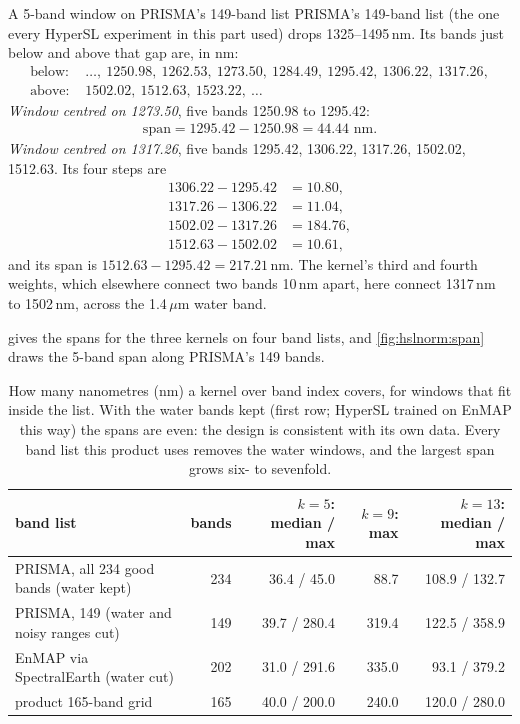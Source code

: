 \begin{worked}[label={we:hslnorm:span}]{A 5-band window on PRISMA's 149-band list}
PRISMA's 149-band list (the one every HyperSL experiment in this part used) drops 1325--1495\,nm. Its bands just below
and above that gap are, in nm\tagC:
\begin{align*}
\text{below: }&\dots,\ 1250.98,\ 1262.53,\ 1273.50,\ 1284.49,\ 1295.42,\ 1306.22,\ 1317.26,\\
\text{above: }&1502.02,\ 1512.63,\ 1523.22,\ \dots
\end{align*}
\emph{Window centred on 1273.50}, five bands 1250.98 to 1295.42:
\begin{align*}
\text{span} = 1295.42-1250.98 = 44.44\text{ nm}.
\end{align*}
\emph{Window centred on 1317.26}, five bands 1295.42, 1306.22, 1317.26, 1502.02, 1512.63. Its four steps are
\begin{align*}
1306.22-1295.42 &= 10.80,\\
1317.26-1306.22 &= 11.04,\\
1502.02-1317.26 &= 184.76,\\
1512.63-1502.02 &= 10.61,
\end{align*}
and its span is $1512.63-1295.42=217.21$\,nm\tagC. The kernel's third and fourth weights, which elsewhere connect two
bands 10\,nm apart, here connect 1317\,nm to 1502\,nm, across the 1.4\,$\mu$m water band.
\end{worked}

 gives the spans for the three kernels on four band lists, and \cref{fig:hslnorm:span} draws
the 5-band span along PRISMA's 149 bands.

\begin{table}[htbp]
\centering\small
\begin{tabular}{@{}p{50mm}rrrr@{}}
\toprule
band list & bands & $k=5$: median / max & $k=9$: max & $k=13$: median / max \\
\midrule
PRISMA, all 234 good bands (water kept) & 234 & 36.4 / 45.0 & 88.7 & 108.9 / 132.7 \\
PRISMA, 149 (water and noisy ranges cut) & 149 & 39.7 / 280.4 & 319.4 & 122.5 / 358.9 \\
EnMAP via SpectralEarth (water cut) & 202 & 31.0 / 291.6 & 335.0 & 93.1 / 379.2 \\
product 165-band grid & 165 & 40.0 / 200.0 & 240.0 & 120.0 / 280.0 \\
\bottomrule
\end{tabular}
\caption{How many nanometres (nm) a kernel over band index covers, for windows that fit inside the list\tagC. With the
water bands kept (first row; HyperSL trained on EnMAP this way) the spans are even: the design is consistent with its
own data. Every band list this product uses removes the water windows, and the largest span grows six- to sevenfold.}
\label{tab:hslnorm:spans}
\end{table}

